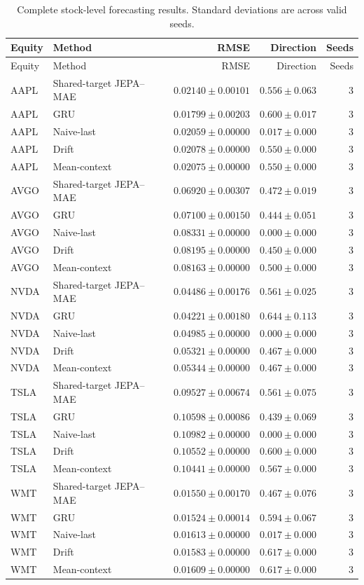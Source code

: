 \begin{longtable}{llrrr}
\caption{Complete stock-level forecasting results. Standard deviations are across valid seeds.}\label{tab:appendix_stock_metrics}\\
\toprule
Equity & Method & RMSE & Direction & Seeds \\
\midrule
\endfirsthead
\toprule
Equity & Method & RMSE & Direction & Seeds \\
\midrule
\endhead
AAPL & Shared-target JEPA--MAE & $0.02140 \pm 0.00101$ & $0.556 \pm 0.063$ & 3 \\
AAPL & GRU & $0.01799 \pm 0.00203$ & $0.600 \pm 0.017$ & 3 \\
AAPL & Naive-last & $0.02059 \pm 0.00000$ & $0.017 \pm 0.000$ & 3 \\
AAPL & Drift & $0.02078 \pm 0.00000$ & $0.550 \pm 0.000$ & 3 \\
AAPL & Mean-context & $0.02075 \pm 0.00000$ & $0.550 \pm 0.000$ & 3 \\
AVGO & Shared-target JEPA--MAE & $0.06920 \pm 0.00307$ & $0.472 \pm 0.019$ & 3 \\
AVGO & GRU & $0.07100 \pm 0.00150$ & $0.444 \pm 0.051$ & 3 \\
AVGO & Naive-last & $0.08331 \pm 0.00000$ & $0.000 \pm 0.000$ & 3 \\
AVGO & Drift & $0.08195 \pm 0.00000$ & $0.450 \pm 0.000$ & 3 \\
AVGO & Mean-context & $0.08163 \pm 0.00000$ & $0.500 \pm 0.000$ & 3 \\
NVDA & Shared-target JEPA--MAE & $0.04486 \pm 0.00176$ & $0.561 \pm 0.025$ & 3 \\
NVDA & GRU & $0.04221 \pm 0.00180$ & $0.644 \pm 0.113$ & 3 \\
NVDA & Naive-last & $0.04985 \pm 0.00000$ & $0.000 \pm 0.000$ & 3 \\
NVDA & Drift & $0.05321 \pm 0.00000$ & $0.467 \pm 0.000$ & 3 \\
NVDA & Mean-context & $0.05344 \pm 0.00000$ & $0.467 \pm 0.000$ & 3 \\
TSLA & Shared-target JEPA--MAE & $0.09527 \pm 0.00674$ & $0.561 \pm 0.075$ & 3 \\
TSLA & GRU & $0.10598 \pm 0.00086$ & $0.439 \pm 0.069$ & 3 \\
TSLA & Naive-last & $0.10982 \pm 0.00000$ & $0.000 \pm 0.000$ & 3 \\
TSLA & Drift & $0.10552 \pm 0.00000$ & $0.600 \pm 0.000$ & 3 \\
TSLA & Mean-context & $0.10441 \pm 0.00000$ & $0.567 \pm 0.000$ & 3 \\
WMT & Shared-target JEPA--MAE & $0.01550 \pm 0.00170$ & $0.467 \pm 0.076$ & 3 \\
WMT & GRU & $0.01524 \pm 0.00014$ & $0.594 \pm 0.067$ & 3 \\
WMT & Naive-last & $0.01613 \pm 0.00000$ & $0.017 \pm 0.000$ & 3 \\
WMT & Drift & $0.01583 \pm 0.00000$ & $0.617 \pm 0.000$ & 3 \\
WMT & Mean-context & $0.01609 \pm 0.00000$ & $0.617 \pm 0.000$ & 3 \\
\bottomrule
\end{longtable}
